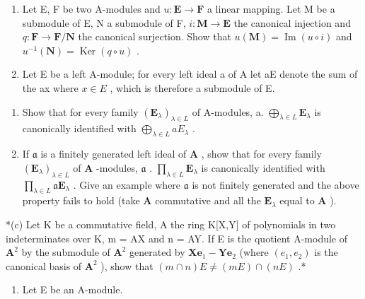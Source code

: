 \BourbakiExercisesSection

\begin{enumerate}
\def\labelenumi{\arabic{enumi}.}
\item
  Let E, F be two A-modules and \(u: \mathbf{E} \to \mathbf{F}\) a linear mapping. Let M be a submodule of E, N a submodule of F, \(i: \mathbf{M} \to \mathbf{E}\) the canonical injection and \(q: \mathbf{F} \to \mathbf{F} / \mathbf{N}\) the canonical surjection. Show that \(u(\mathbf{M}) = \operatorname{Im}(u \circ i)\) and \(u^{-1}(\mathbf{N}) = \operatorname{Ker}(q \circ u)\) .
\item
  Let E be a left A-module; for every left ideal a of A let aE denote the sum of the ax where \(x \in E\) , which is therefore a submodule of E.
\end{enumerate}

\begin{enumerate}
\def\labelenumi{(\alph{enumi})}
\item
  Show that for every family \((\mathbf{E}_{\lambda})_{\lambda \in L}\) of A-modules, a. \(\bigoplus_{\lambda \in L} \mathbf{E}_{\lambda}\) is canonically identified with \(\bigoplus_{\lambda \in L} a E_{\lambda}\) .
\item
  If \(\mathfrak{a}\) is a finitely generated left ideal of \(\mathbf{A}\) , show that for every family \((\mathbf{E}_{\lambda})_{\lambda \in L}\) of \(\mathbf{A}\) -modules, \(\mathfrak{a}\) . \(\prod_{\lambda \in L} \mathbf{E}_{\lambda}\) is canonically identified with \(\prod_{\lambda \in L} \mathfrak{a}\mathbf{E}_{\lambda}\) . Give an example where \(\mathfrak{a}\) is not finitely generated and the above property fails to hold (take \(\mathbf{A}\) commutative and all the \(\mathbf{E}_{\lambda}\) equal to \(\mathbf{A}\) ).
\end{enumerate}

*(c) Let K be a commutative field, A the ring K{[}X,Y{]} of polynomials in two indeterminates over K, m = AX and n = AY. If E is the quotient A-module of \(\mathbf{A}^2\) by the submodule of \(\mathbf{A}^2\) generated by \(\mathbf{Xe}_1 - \mathbf{Ye}_2\) (where \((e_1, e_2)\) is the canonical basis of \(\mathbf{A}^2\) ), show that \((m \cap n)E \neq (mE) \cap (nE)\) .*

\begin{enumerate}
\def\labelenumi{\arabic{enumi}.}
\setcounter{enumi}{2}
\tightlist
\item
  Let E be an A-module.
\end{enumerate}

